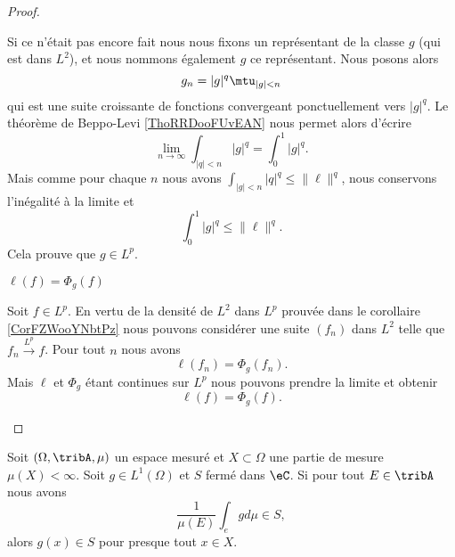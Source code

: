 \begin{proof}
\begin{subproof}
\begin{subproof}
                    Si ce n'était pas encore fait nous nous fixons un représentant de la classe \( g\) (qui est dans \( L^2\)), et nous nommons également \( g\) ce représentant. Nous posons alors
                    \begin{equation}
                        g_n=| g |^q\mtu_{| g |<n}
                    \end{equation}
                    qui est une suite croissante de fonctions convergeant ponctuellement vers \( | g |^q\). Le théorème de Beppo-Levi \ref{ThoRRDooFUvEAN} nous permet alors d'écrire
                    \begin{equation}
                        \lim_{n\to \infty} \int_{| q |<n}| g |^q=\int_{0}^1| g |^q.
                    \end{equation}
                    Mais comme pour chaque \( n\) nous avons \( \int_{| g |<n}| q |^q\leq \| \ell \|^q\), nous conservons l'inégalité à la limite et
                    \begin{equation}
                        \int_0^1| g |^q\leq \| \ell \|^q.
                    \end{equation}
                    Cela prouve que \( g\in L^p\).

                \item[\( \ell(f)=\Phi_g(f)\)]

                    Soit \( f\in L^p\). En vertu de la densité de \( L^2\) dans \( L^p\) prouvée dans le corollaire \ref{CorFZWooYNbtPz} nous pouvons considérer une suite \( (f_n)\) dans \( L^2\) telle que \( f_n\stackrel{L^p}{\longrightarrow}f\). Pour tout \( n\) nous avons
                    \begin{equation}
                        \ell(f_n)=\Phi_g(f_n).
                    \end{equation}
                    Mais \( \ell\) et \( \Phi_g\) étant continues sur \( L^p\) nous pouvons prendre la limite et obtenir
                    \begin{equation}
                        \ell(f)=\Phi_g(f).
                    \end{equation}
            \end{subproof}
        \end{subproof}
\end{proof}

\begin{lemma} \label{LemHNPEooHtMOGY}
    Soit \( (\Omega,\tribA,\mu)\) un espace mesuré et \( X\subset \Omega\) une partie de mesure \( \mu(X)<\infty\). Soit \( g\in L^1(\Omega)\) et \( S\) fermé dans \( \eC\). Si pour tout \( E\in \tribA\) nous avons
    \begin{equation}
        \frac{1}{ \mu(E) }\int_egd\mu\in S,
    \end{equation}
    alors \( g(x)\in S\) pour presque tout \( x\in X\).
\end{lemma}

